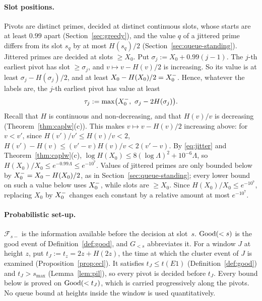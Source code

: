 \paragraph{Slot positions.}
Pivots are distinct primes, decided at distinct continuous slots, whose starts are at least $0.99$ apart
(Section~\ref{sec:greedy}), and the value $q$ of a jittered prime differs
from its slot $s_q$ by at most $H(s_q)/2$ (Section~\ref{sec:queue-standing}). Jittered primes are decided at slots
$\ge X_0$. Put $\sigma_j:=X_0+0.99(j-1)$. The $j$-th earliest pivot has slot $\ge\sigma_j$, and $v\mapsto v-H(v)/2$ is
increasing. So its value is at least $\sigma_j-H(\sigma_j)/2$, and at least $X_0-H(X_0)/2=X_0^{-}$. Hence, whatever the labels
are, the $j$-th earliest pivot has value at least
\begin{equation}\label{eq:A-tau}
  \tau_j:=\max\bigl(X_0^{-},\ \sigma_j-2H(\sigma_j)\bigr).
\end{equation}
Recall that $H$ is continuous and non-decreasing, and that $H(v)/v$ is decreasing (Theorem~\ref{thm:caplw}(c)). This
makes $v\mapsto v-H(v)/2$ increasing above: for $v<v'$, since $H(v')/v'\le H(v)/v<2$,
$H(v')-H(v)\le(v'-v)H(v)/v<2(v'-v)$. By \eqref{eq:jitter} and
Theorem~\ref{thm:caplw}(c), $\log H(X_0)\le8(\log\Lambda)^2+10^{-6}\Lambda$, so $H(X_0)/X_0\le e^{-0.99\Lambda}\le
e^{-10^{7}}$.
Values of jittered primes are only bounded below by $X_0^{-}=X_0-H(X_0)/2$, as in Section~\ref{sec:queue-standing}; every
lower bound on such a value below uses $X_0^{-}$, while slots are $\ge X_0$. Since $H(X_0)/X_0\le e^{-10^7}$, replacing $X_0$ by
$X_0^{-}$ changes each constant by a relative amount at most $e^{-10^{7}}$.

\paragraph{Probabilistic set-up.}
$\mathcal F_{s-}$ is the information available before the decision at slot~$s$. $\mathrm{Good}(<s)$ is the good event of
Definition~\ref{def:good}, and $G_{<s}$ abbreviates it. For a window $J$ at height $z$, put $t_J:=t_z=2z+H(2z)$, the
time at which the cluster event of $J$ is examined (Proposition~\ref{prop:ecl}). It satisfies $t_J\le t(E1)$
(Definition~\ref{def:good}) and $t_J>s_{\max}$ (Lemma~\ref{lem:pil}), so every pivot is decided before $t_J$. Every bound below is proved
on $\mathrm{Good}(<t_J)$, which is carried progressively along the pivots. No queue bound at heights inside the window is
used quantitatively.

